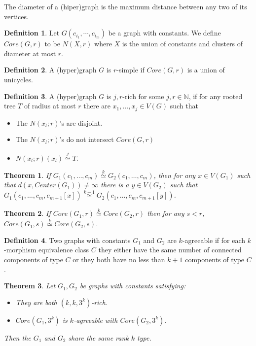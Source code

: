 \documentclass[11pt,notitlepage]{report}
\newtheorem{theorem}{Theorem}[chapter]
\theoremstyle{definition}
\newtheorem{definition}{Definition}[chapter]
\newcommand{\N}{\mathbb{N}}
\newcommand{\clist}{c_{i_1}, \cdots, c_{i_m}}
\newcommand{\morph}[1]{\stackrel{#1}{\simeq}}
\begin{document}
The diameter of a (hiper)graph is the maximum distance between any two of its vertices. 

\begin{definition} 
	Let $G(\clist)$ be a graph with constants. We define $Core(G,r)$ to be
	$N(X,r)$ where $X$ is the union of constants and clusters of diameter at most $r$. 
\end{definition}


\begin{definition} 
	A (hyper)graph $G$ is $r$-simple if $Core(G,r)$ is a union of unicycles. 
\end{definition}

\begin{definition}
	A (hyper)graph $G$ is $j,r$-rich for some $j,r\in \N$, if for any rooted tree $T$
	of radius at most $r$ there are $x_1,\dots,x_j\in V(G)$ such that
	\begin{itemize}
		\item The $N(x_l;r)$'s are disjoint.
		\item The $N(x_l;r)$'s do not intersect $Core(G,r)$
		\item $N(x_l;r)(x_l) \morph{j} T$.		
	\end{itemize} 
\end{definition}


\begin{theorem}
	If $G_1(c_1,\dots,c_m)\morph{k} G_2(c_1,\dots,c_m)$, then for any $x\in V(G_1)$ such 
	that $d(x,Center(G_1))\neq \infty$ there is a $y\in V(G_2)$ such that
	$G_1(c_1,\dots,c_m,c_{m+1}[x])\morph{k-1} G_2(c_1,\dots,c_m,c_{m+1}[y])$.
\end{theorem}

\begin{theorem}
	If $Core(G_1,r)\morph{k} Core(G_2,r)$ then for any $s<r$, $Core(G_1,s)\morph{k} Core(G_2,s)$.
\end{theorem}


\begin{definition} 
	Two graphs with constants $G_1$ and $G_2$ are $k$-agreeable if for each $k$-morphism 
	equivalence class $C$ they either have the same number of connected components of type
	$C$ or they both have no less than $k+1$ components of type $C$. 
\end{definition}


\begin{theorem} 
	Let $G_1, G_2$ be graphs with constants satisfying:
	\begin{itemize}
		\item They are both $(k, k, 3^k)$-rich.
		\item $Core(G_1,3^k)$ is $k$-agreeable with $Core(G_2,3^k)$.
	\end{itemize} 
	Then the $G_1$ and $G_2$ share the same rank $k$ type.
\end{theorem}
\end{document}
